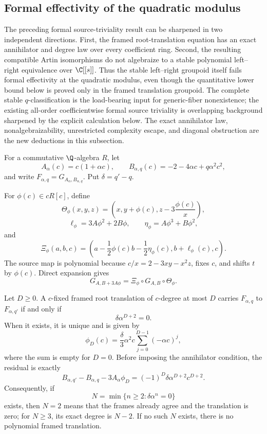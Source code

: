\subsection{Formal effectivity of the quadratic modulus}
\label{subsec:formal-effectivity-q-modulus}

The preceding formal source-triviality result can be sharpened in two
independent directions.  First, the framed root-translation equation has an
exact annihilator and degree law over every coefficient ring.  Second, the
resulting compatible Artin isomorphisms do not algebraize to a stable
polynomial left--right equivalence over \(\C[[s]]\).  Thus the stable
left--right groupoid itself fails formal effectivity at the quadratic
modulus, even though the quantitative lower bound below is proved only in the
framed translation groupoid.  The complete stable \(q\)-classification is
the load-bearing input for generic-fiber nonexistence; the existing all-order
coefficientwise formal source triviality is overlapping background sharpened
by the explicit calculation below.  The exact annihilator law,
nonalgebraizability, unrestricted complexity escape, and diagonal obstruction
are the new deductions in this subsection.

For a commutative \(\Q\)-algebra \(R\), let
\[
 A_\alpha(c)=c(1+\alpha c),\qquad
 B_{\alpha,q}(c)=-2-4\alpha c+q\alpha^2c^2,
\]
and write \(F_{\alpha,q}=G_{A_\alpha,B_{\alpha,q}}\).  Put
\(\delta=q'-q\).

For \(\phi(c)\in cR[c]\), define
\[
 \Theta_\phi(x,y,z)=
 \left(x,y+\phi(c),z-3\frac{\phi(c)}x\right),
\]
\[
 \ell_\phi=3A\phi^2+2B\phi,
 \qquad
 \eta_\phi=A\phi^3+B\phi^2,
\]
and
\[
 \Xi_\phi(a,b,c)=
 \left(a-\frac12\phi(c)b-\frac12\eta_\phi(c),
       b+\ell_\phi(c),c\right).
\]
The source map is polynomial because \(c/x=2-3xy-x^2z\), fixes \(c\),
and shifts \(t\) by \(\phi(c)\).  Direct expansion gives
\begin{equation}
\label{eq:q-pairwise-root-translation}
 G_{A,B+3A\phi}=\Xi_\phi\circ G_{A,B}\circ\Theta_\phi.
\end{equation}

\begin{theorem}
\label{thm:q-framed-effectivity-law}
Let \(D\ge0\).  A \(c\)-fixed framed root translation of
\(c\)-degree at most \(D\) carries \(F_{\alpha,q}\) to
\(F_{\alpha,q'}\) if and only if
\[
 \delta\alpha^{D+2}=0.
\]
When it exists, it is unique and is given by
\[
 \phi_D(c)=\frac\delta3\alpha^2c
 \sum_{j=0}^{D-1}(-\alpha c)^j,
\]
where the sum is empty for \(D=0\).  Before imposing the annihilator
condition, the residual is exactly
\[
 B_{\alpha,q'}-B_{\alpha,q}-3A_\alpha\phi_D
 =(-1)^D\delta\alpha^{D+2}c^{D+2}.
\]
Consequently, if
\[
 N=\min\{n\ge2:\delta\alpha^n=0\}
\]
exists, then \(N=2\) means that the frames already agree and the
translation is zero; for \(N\ge3\), its exact degree is \(N-2\).  If no
such \(N\) exists, there is no polynomial framed translation.
\end{theorem}

